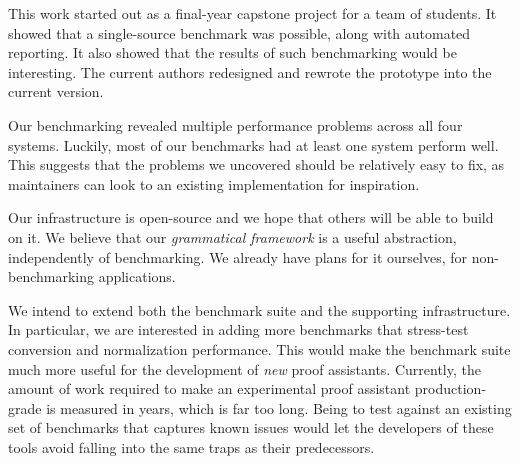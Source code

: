 \documentclass[a4paper,UKenglish,cleveref, autoref, thm-restate,anonymous]{lipics-v2021}
\begin{document}
This work started out as a final-year capstone project for a team of students. It
showed that a single-source benchmark was possible, along with automated reporting.
It also showed that the results of such benchmarking would be interesting. The current
authors redesigned and rewrote the prototype into the current version.

Our benchmarking revealed multiple performance problems across all four systems.
Luckily, most of our benchmarks had at least one system perform well. This suggests
that the problems we uncovered should be relatively easy to fix, as maintainers
can look to an existing implementation for inspiration.

Our infrastructure is open-source and we hope that others will be able to build on it.
We believe that our \emph{grammatical framework} is a useful abstraction, independently
of benchmarking.  We already have plans for it ourselves, for non-benchmarking applications.

We intend to extend both the \panbench benchmark suite and the supporting infrastructure.
In particular, we are interested in adding more benchmarks that stress-test conversion
and normalization performance. This would make the \panbench benchmark suite much
more useful for the development of \emph{new} proof assistants. Currently, the amount
of work required to make an experimental proof assistant production-grade is measured
in years, which is far too long. Being to test against an existing set of benchmarks that
captures known issues would let the developers of these tools avoid falling into the
same traps as their predecessors.


\end{document}
